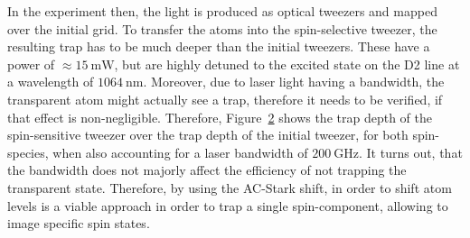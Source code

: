 \begin{figure}[t]%
\label{fig:light_shift_cross}
\end{figure}

In the experiment then, the light is produced as optical tweezers and mapped over the initial grid. To transfer the atoms into the spin-selective tweezer, the resulting trap has to be much deeper than the initial tweezers. These have a power of $\approx\SI{15}{\milli\watt}$, but are highly detuned to the excited state on the D2 line at a wavelength of $\SI{1064}{\nano\meter}$. Moreover, due to laser light having a bandwidth, the transparent atom might actually see a trap, therefore it needs to be verified, if that effect is non-negligible. Therefore, Figure~\ref{fig:relative_trap} shows the trap depth of the spin-sensitive tweezer over the trap depth of the initial tweezer, for both spin-species, when also accounting for a laser bandwidth of $\SI{200}{\giga\hertz}$. It turns out, that the bandwidth does not majorly affect the efficiency of not trapping the transparent state. Therefore, by using the AC-Stark shift, in order to shift atom levels is a viable approach in order to trap a single spin-component, allowing to image specific spin states.


\begin{figure}[t]%
\label{fig:relative_trap}
\end{figure}

